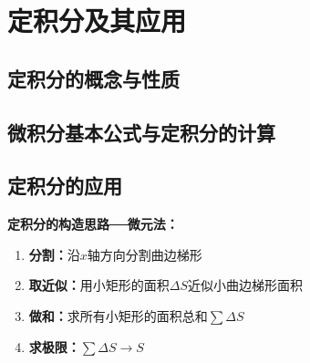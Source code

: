 \setcounter{chapter}{5}

\chapter{定积分及其应用}

\section{定积分的概念与性质}




\section{微积分基本公式与定积分的计算}



\section{定积分的应用}

{\bf 定积分的构造思路──微元法：}

\begin{enumerate}
  \item {\bf 分割：}沿$x$轴方向分割曲边梯形 
  \item {\bf 取近似：}用小矩形的面积$\Delta S$近似小曲边梯形面积 
  \item {\bf 做和：}求所有小矩形的面积总和$\sum \Delta S$ 
  \item {\bf 求极限：}$\sum \Delta S\to S$
\end{enumerate}

\begin{center}
\end{center}

